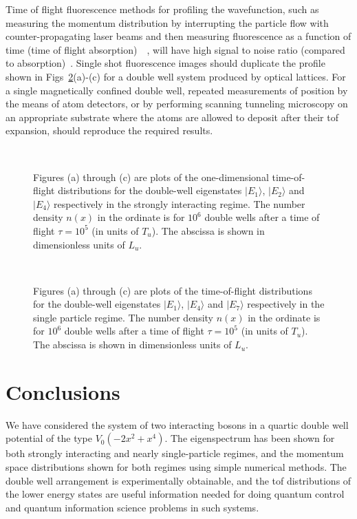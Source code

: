 \documentclass{article}
\begin{document}
Time of flight fluorescence methods for profiling the wavefunction, such as measuring the momentum distribution by interrupting the particle flow with counter-propagating laser beams and then measuring fluorescence as a function of time (time of flight absorption)~\cite{fluorescense}~\cite{fluorescense:web}, will have high signal to noise ratio (compared to absorption)~\cite{raizen}.  Single shot fluorescence images should duplicate the profile shown in Figs~\ref{fig:tof_1lakh }(a)-(c) for a double well system produced by optical lattices. For a single magnetically confined double well, repeated measurements of position by the means of atom detectors, or by performing scanning tunneling microscopy on an appropriate substrate where the atoms are allowed to deposit after their tof expansion, should reproduce the required results.
\pagebreak

\begin{figure}
\ 
\caption{Figures (a) through (c) are plots of the one-dimensional time-of-flight distributions for the double-well eigenstates $| E_1\rangle$, $| E_2\rangle$ and $| E_4\rangle$ respectively in the strongly interacting regime. The number density $n(x)$ in the ordinate is for $10^6$ double wells after a time of flight $\tau = 10^5$ (in units of $T_u$). The abscissa is shown in dimensionless units of $L_u$. }
\label{fig:tof_1lakh_tonks }
\end{figure}

\begin{figure}
\ 
\caption{Figures (a) through (c) are plots of the time-of-flight distributions for the double-well eigenstates $| E_1\rangle$, $| E_4\rangle$ and $| E_7\rangle$ respectively in the single particle regime. The number density $n(x)$ in the ordinate is for $10^6$ double wells after a time of flight $\tau = 10^5$ (in units of $T_u$). The abscissa is shown in dimensionless units of $L_u$.}
\label{fig:tof_1lakh }
\end{figure}

\section{Conclusions}
%
%
We have considered the system of two interacting bosons in a quartic double well potential of the type $V_0 (-2x^2+x^4)$. The eigenspectrum has been shown for both strongly interacting and nearly single-particle regimes, and the momentum space distributions shown for both regimes using simple numerical methods. The double well arrangement is experimentally obtainable, and the tof distributions of the lower energy states are useful information needed for doing quantum control and quantum information science problems in such systems.
%
%
%
\end{document}
